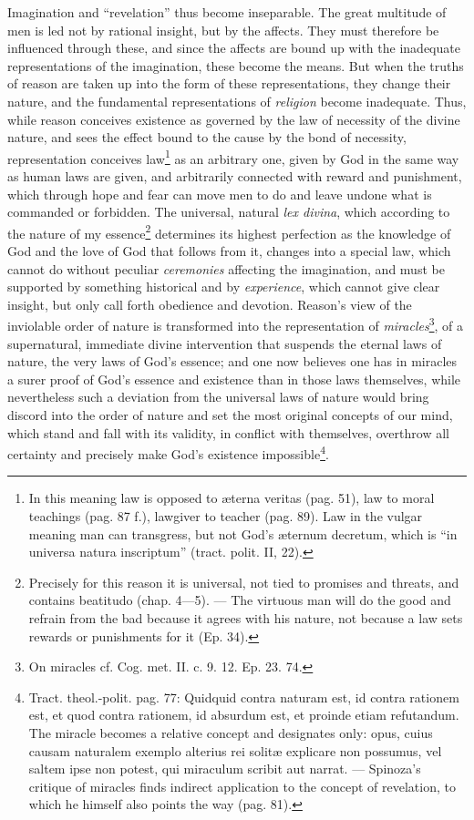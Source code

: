 \documentclass[12pt,a4paper,openany]{book}
\newcommand{\opage}[1]{\marginnote{\footnotesize\textit{[#1]}}}
\begin{document}
\opage{153}\setcounter{footnote}{0}Imagination and ``revelation'' thus become inseparable. The great multitude of men is led not by rational insight, but by the affects. They must therefore be influenced through these, and since the affects are bound up with the inadequate representations of the imagination, these become the means. But when the truths of reason are taken up into the form of these representations, they change their nature, and the fundamental representations of \emph{religion} become inadequate. Thus, while reason conceives existence as governed by the law of necessity of the divine nature, and sees the effect bound to the cause by the bond of necessity, representation conceives law\footnote{In this meaning law is opposed to æterna veritas (pag. 51), law to moral teachings (pag. 87 f.), lawgiver to teacher (pag. 89). Law in the vulgar meaning man can transgress, but not God's æternum decretum, which is ``in universa natura inscriptum'' (tract. polit. II, 22).} as an arbitrary one, given by God in the same way as human laws are given, and arbitrarily connected with reward and punishment, which through hope and fear can move men to do and leave undone what is commanded or forbidden. The universal, natural \emph{lex divina}, which according to the nature of my essence\footnote{Precisely for this reason it is universal, not tied to promises and threats, and contains beatitudo (chap. 4---5). --- The virtuous man will do the good and refrain from the bad because it agrees with his nature, not because a law sets rewards or punishments for it (Ep. 34).} determines its highest perfection as the knowledge of God and the love of God that follows from it, changes into a special law, which cannot do without peculiar \emph{ceremonies} affecting the imagination, and must be supported by something historical and by \emph{experience}, which cannot give clear insight, but only call forth obedience and devotion. Reason's view of the inviolable order of nature is transformed into the representation of
\opage{154}\setcounter{footnote}{0}\emph{miracles}\footnote{On miracles cf. Cog. met. II. c. 9. 12. Ep. 23. 74.}, of a supernatural, immediate divine intervention that suspends the eternal laws of nature, the very laws of God's essence; and one now believes one has in miracles a surer proof of God's essence and existence than in those laws themselves, while nevertheless such a deviation from the universal laws of nature would bring discord into the order of nature and set the most original concepts of our mind, which stand and fall with its validity, in conflict with themselves, overthrow all certainty and precisely make God's existence impossible\footnote{Tract. theol.-polit. pag. 77: Quidquid contra naturam est, id contra rationem est, et quod contra rationem, id absurdum est, et proinde etiam refutandum. The miracle becomes a relative concept and designates only: opus, cuius causam naturalem exemplo alterius rei solitæ explicare non possumus, vel saltem ipse non potest, qui miraculum scribit aut narrat. --- Spinoza's critique of miracles finds indirect application to the concept of revelation, to which he himself also points the way (pag. 81).}.
\end{document}
